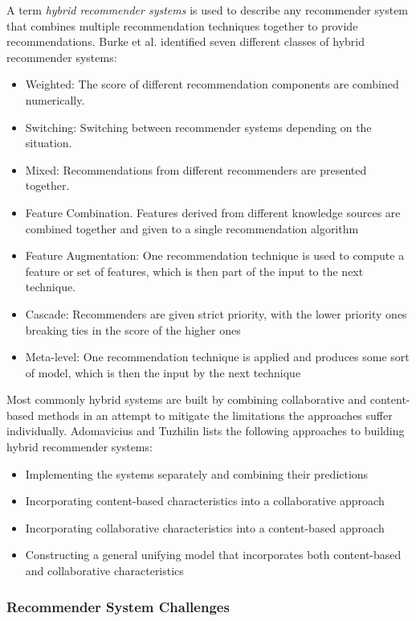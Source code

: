 A term \emph{hybrid recommender systems} is used to describe any recommender
system that combines multiple recommendation techniques together to provide
recommendations. Burke et al. \cite{Burke2002} identified seven different
classes of hybrid recommender systems:

\begin{itemize}
\item Weighted: The score of different recommendation components are combined numerically.
\item Switching: Switching between recommender systems depending on the situation.
\item Mixed: Recommendations from different recommenders are presented together.
\item Feature Combination. Features derived from different knowledge sources
are combined together and given to a single recommendation algorithm
\item Feature Augmentation: One recommendation technique is used to compute a
feature or set of features, which is then part of the input to the next
technique.
\item Cascade: Recommenders are given strict priority, with the lower priority
ones breaking ties in the score of the higher ones
\item Meta-level: One recommendation technique is applied and produces some
sort of model, which is then the input by the next technique
\end{itemize}

Most commonly hybrid systems are built by combining collaborative and
content-based methods in an attempt to mitigate the limitations the approaches
suffer individually. Adomavicius and Tuzhilin \cite{Adomavicius2005} lists the
following approaches to building hybrid recommender systems:

\begin{itemize}
\item Implementing the systems separately and combining their predictions
\item Incorporating content-based characteristics into a collaborative approach
\item Incorporating collaborative characteristics into a content-based approach
\item Constructing a general unifying model that incorporates both
content-based and collaborative characteristics
\end{itemize}

\subsubsection{Recommender System Challenges}

